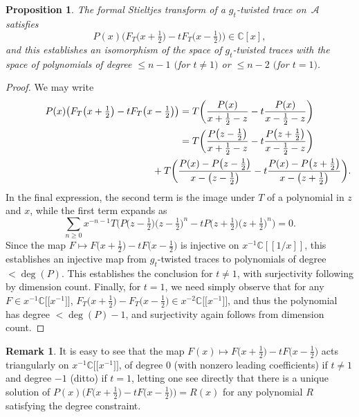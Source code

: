 \documentclass[pdftex]{sigma}
\newcommand{\CN}{\mathbb{C}} %
\newcommand{\mc}[1]{\mathcal{#1}}
\newtheorem{Proposition}[Theorem]{Proposition}
\theoremstyle{definition}
\newtheorem{Remark}[Theorem]{Remark}
\numberwithin{equation}{section}
\begin{document}
\begin{Proposition}
 The formal Stieltjes transform of a $g_t$-twisted trace on~$\mc A$
 satisfies
 \[
 P(x)\big(F_T\big(x+\tfrac{1}{2}\big)-t F_T\big(x-\tfrac{1}{2}\big)\big)\in \CN[x],
 \]
 and this establishes an isomorphism of the space of $g_t$-twisted traces
 with the space of polynomials of degree $\le n-1$ $($for $t\ne 1)$ or $\le
 n-2$ $($for $t=1)$.
\end{Proposition}

\begin{proof}
 We may write
 \begin{gather*}
 P(x)\big(F_T\big(x+\tfrac{1}{2}\big) - t F_T\big(x-\tfrac{1}{2}\big)\big)
 = T\bigg(\frac{P(x)}{x+\frac{1}{2}-z}-t \frac{P(x)}{x-\frac{1}{2}-z}\bigg)
 \\ \hphantom{ P(x)\big(F_T\big(x+\tfrac{1}{2}\big) - t F_T\big(x-\tfrac{1}{2}\big)\big)}
 {}= T\bigg(\frac{P\big(z-\frac{1}{2}\big)}{x+\frac{1}{2}-z}-t \frac{P\big(z+\frac{1}{2}\big)}{x-\frac{1}{2}-z}\bigg)
 \\ \hphantom{ P(x)\big(F_T\big(x+\tfrac{1}{2}\big) - t F_T\big(x-\tfrac{1}{2}\big)\big)=}
{}+ T\bigg(\frac{P(x)-P\big(z-\frac{1}{2}\big)}{x-\big(z-\frac{1}{2}\big)}-t \frac{P(x)-P\big(z+\frac{1}{2}\big)}{x-\big(z+\frac{1}{2}\big)}\bigg).
 \end{gather*}
 In the final expression, the second term is the image under $T$ of a
 polynomial in $z$ and $x$, while the first term expands as
 \[
 \sum_{n\ge 0} x^{-n-1} T\big(P\big(z-\tfrac{1}{2}\big)\big(z-\tfrac{1}{2}\big)^n-t P\big(z+\tfrac{1}{2}\big)\big(z+\tfrac{1}{2}\big)^n\big) = 0.
 \]
 Since the map $F\mapsto F\big(x+\tfrac{1}{2}\big)-t F\big(x-\tfrac{1}{2}\big)$ is injective on $x^{-1}\mathbb C[[1/x]]$, this establishes an
 injective map from $g_t$-twisted traces to polynomials of degree
 $<\deg(P)$. This establishes the conclusion for $t\ne 1$, with surjectivity following by dimension count.
 Finally, for $t=1$, we need simply observe that for any $F\in x^{-1}\CN\big[\big[x^{-1}\big]\big]$,
 $F_T\big(x+\frac{1}{2}\big)-F_T\big(x-\tfrac{1}{2}\big)\in x^{-2}\CN\big[\big[x^{-1}\big]\big]$, and thus the polynomial has
 degree $<\deg(P)-1$, and surjectivity again follows from dimension count.
\end{proof}

\begin{Remark} It is easy to see that the map $F(x)\mapsto F\big(x+\frac{1}{2}\big)-t F\big(x-\tfrac{1}{2}\big)$ acts triangularly
 on $x^{-1}\CN\big[\big[x^{-1}\big]\big]$, of degree $0$ (with nonzero leading coefficients)
 if $t\ne 1$ and degree $-1$ (ditto) if $t=1$, letting one see directly
 that there is a unique solution of $P(x)\big(F\big(x+\frac{1}{2}\big)-t F\big(x-\tfrac{1}{2}\big)\big)=R(x)$
 for any polynomial $R$ satisfying the degree constraint.
\end{Remark}
\end{document}
